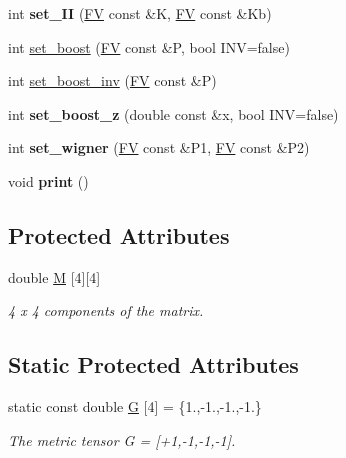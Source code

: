 \begin{DoxyCompactItemize}
\item 
\hypertarget{classLT_ac2718d29c891a91aa5058dc929ffecdd}{}int {\bfseries set\+\_\+\+I\+I} (\hyperlink{classFV}{F\+V} const \&K, \hyperlink{classFV}{F\+V} const \&Kb)\label{classLT_ac2718d29c891a91aa5058dc929ffecdd}

\item 
int \hyperlink{classLT_a0f1f4b9fb6a2b084908abb6bc687cd4f}{set\+\_\+boost} (\hyperlink{classFV}{F\+V} const \&P, bool I\+N\+V=false)
\item 
int \hyperlink{classLT_a84cf79cd6014d4ecc645c1dcc0258b5e}{set\+\_\+boost\+\_\+inv} (\hyperlink{classFV}{F\+V} const \&P)
\item 
\hypertarget{classLT_a7dce276751d25954b2d249516d5191a4}{}int {\bfseries set\+\_\+boost\+\_\+z} (double const \&x, bool I\+N\+V=false)\label{classLT_a7dce276751d25954b2d249516d5191a4}

\item 
\hypertarget{classLT_a5a8d17a0e9374ba9cef862c1f98a5d62}{}int {\bfseries set\+\_\+wigner} (\hyperlink{classFV}{F\+V} const \&P1, \hyperlink{classFV}{F\+V} const \&P2)\label{classLT_a5a8d17a0e9374ba9cef862c1f98a5d62}

\item 
\hypertarget{classLT_a6687d255d8543565e26ae9bc37b4a414}{}void {\bfseries print} ()\label{classLT_a6687d255d8543565e26ae9bc37b4a414}

\end{DoxyCompactItemize}
\subsection*{Protected Attributes}
\begin{DoxyCompactItemize}
\item 
\hypertarget{classLT_adfe83a60779798fcb358f2fb12d79cda}{}double \hyperlink{classLT_adfe83a60779798fcb358f2fb12d79cda}{M} \mbox{[}4\mbox{]}\mbox{[}4\mbox{]}\label{classLT_adfe83a60779798fcb358f2fb12d79cda}

\begin{DoxyCompactList}\small\item\em 4 x 4 components of the matrix. \end{DoxyCompactList}\end{DoxyCompactItemize}
\subsection*{Static Protected Attributes}
\begin{DoxyCompactItemize}
\item 
\hypertarget{classLT_a3ec591d3e26134d35eb127d0610c7866}{}static const double \hyperlink{classLT_a3ec591d3e26134d35eb127d0610c7866}{G} \mbox{[}4\mbox{]} = \{1.,-\/1.,-\/1.,-\/1.\}\label{classLT_a3ec591d3e26134d35eb127d0610c7866}

\begin{DoxyCompactList}\small\item\em The metric tensor G = \mbox{[}+1,-\/1,-\/1,-\/1\mbox{]}. \end{DoxyCompactList}\end{DoxyCompactItemize}


